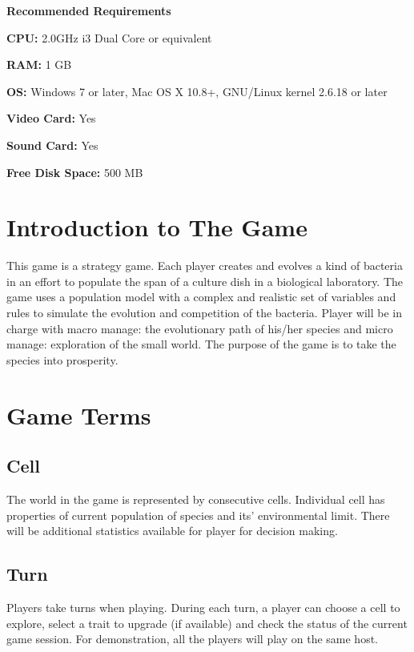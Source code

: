 \documentclass[12pt,a4paper]{scrartcl}
\begin{document}
\large
\textbf{Recommended Requirements}
\begin{list}{}{}
	\item \textbf{CPU:} 2.0GHz i3 Dual Core or equivalent
	\item \textbf{RAM:} 1 GB
	\item \textbf{OS:} Windows 7 or later, Mac OS X 10.8+, GNU/Linux kernel 2.6.18 or later
	\item \textbf{Video Card:} Yes
	\item \textbf{Sound Card:} Yes
	\item \textbf{Free Disk Space:} 500 MB
\end{list}
\clearpage
\tableofcontents
\clearpage

\section{Introduction to The Game}

This game is a strategy game. Each player creates and evolves a kind of bacteria in an effort to populate the span of a culture dish in a biological laboratory. The game uses a population model with a complex and realistic set of variables and rules to simulate the evolution and competition of the bacteria. Player will be in charge with macro manage: the evolutionary path of his/her species and micro manage: exploration of the small world. The purpose of the game is to take the species into prosperity.

\section{Game Terms}

\subsection{Cell}

The world in the game is represented by consecutive cells. Individual cell has properties of current population of species and its' environmental limit. There will be additional statistics available for player for decision making.

\subsection{Turn}

Players take turns when playing. During each turn, a player can choose a cell to explore, select a trait to upgrade (if available) and check the status of the current game session. For demonstration, all the players will play on the same host.
\end{document}
